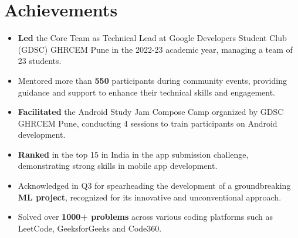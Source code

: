 \documentclass[letterpaper,11pt]{article}
\newcommand{\resumeItem}[1]{
  \item\small{
	{#1 \vspace{-1.5pt}}
  }
}
\begin{document}
\section{Achievements}
 \begin{itemize}[leftmargin=0.15in, label={}]
    	\resumeItem{\textbf{Led} the Core Team as Technical Lead at Google Developers Student Club (GDSC) GHRCEM Pune in the 2022-23 academic year, managing a team of 23 students.}
        \resumeItem{Mentored more than \textbf{550} participants during community events, providing guidance and support to enhance their technical skills and engagement.}
    	\resumeItem{\textbf{Facilitated} the Android Study Jam Compose Camp organized by GDSC GHRCEM Pune, conducting 4 sessions to train participants on Android development.}
        \resumeItem{\textbf{Ranked} in the top 15 in India in the app submission challenge, demonstrating strong skills in mobile app development.}
    	\resumeItem{Acknowledged in Q3 for spearheading the development of a groundbreaking \textbf{ML project}, recognized for its innovative and unconventional approach.}
    	\resumeItem{Solved over \textbf{1000+ problems} across various coding platforms such as LeetCode, GeeksforGeeks and Code360.}
 \end{itemize}
 \vspace{-16pt}
\end{document}

